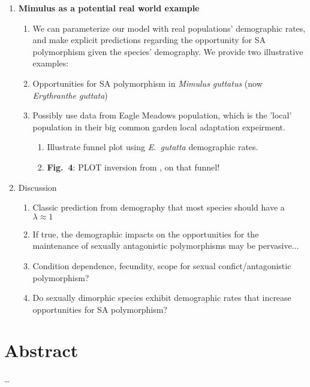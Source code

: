 \documentclass[11pt]{article}
\begin{document}
\begin{enumerate}
	\item {\bf Mimulus as a potential real world example}
	\begin{enumerate}
		\item We can parameterize our model with real populations' demographic rates, and make explicit predictions regarding the opportunity for SA polymorphism given the species' demography. We provide two illustrative examples:
		\item Opportunities for SA polymorphism in {\itshape Mimulus guttatus} (now {\itshape Erythranthe guttata})
		\item Possibly use data from \citet{PetersonEtAl2016} Eagle Meadows population, which is the 'local' population in their big common garden local adaptation expeirment.
		\begin{enumerate}
			\item Illustrate funnel plot using {\itshape E.~gutatta} demographic rates.
			\item \textbf{Fig.~4}: PLOT inversion from \citet{LeeKelly2015}, on that funnel!
		\end{enumerate}

	\end{enumerate}

	\item Discussion
		\begin{enumerate}
			\item Classic prediction from demography that most species should have a $\lambda \approx 1$
			\item If true, the demographic impacts on the opportunities for the maintenance of sexually antagonistic polymorphisms may be pervasive...
			\item Condition dependence, fecundity, scope for sexual confict/antagonistic polymorphism?
			\item Do sexually dimorphic species exhibit demographic rates that increase opportunities for SA polymorphism?

		\end{enumerate}

\end{enumerate}





\newpage{}
\section*{Abstract}
\ldots 
\end{document}

